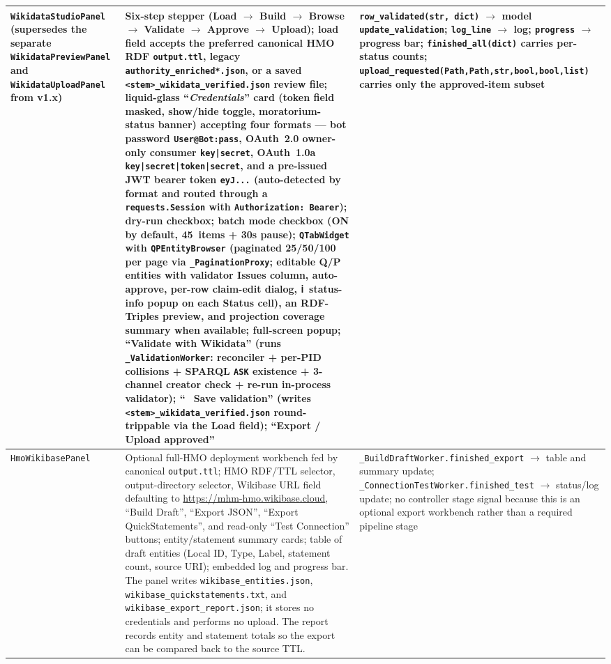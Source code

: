 \documentclass[12pt]{article}
\newcommand{\code}[1]{\texttt{#1}}
\begin{document}
\begin{longtable}{|l|p{4.5cm}|p{4.5cm}|}
\hline
\code{WikidataStudioPanel} (supersedes the separate \code{WikidataPreviewPanel} and \code{WikidataUploadPanel} from v1.x) & Six-step stepper (Load $\to$ Build $\to$ Browse $\to$ Validate $\to$ Approve $\to$ Upload); load field accepts the preferred canonical HMO RDF \code{output.ttl}, legacy \code{authority\_enriched*.json}, or a saved \code{<stem>\_wikidata\_verified.json} review file; liquid-glass ``\emph{Credentials}'' card (token field masked, show/hide toggle, moratorium-status banner) accepting four formats --- bot password \code{User@Bot:pass}, OAuth~2.0 owner-only consumer \code{key|secret}, OAuth~1.0a \code{key|secret|token|secret}, and a pre-issued JWT bearer token \code{eyJ...} (auto-detected by format and routed through a \code{requests.Session} with \code{Authorization: Bearer}); dry-run checkbox; batch mode checkbox (ON by default, 45~items + 30s pause); \code{QTabWidget} with \code{QPEntityBrowser} (paginated 25/50/100 per page via \code{\_PaginationProxy}; editable Q/P entities with validator Issues column, auto-approve, per-row claim-edit dialog, ℹ~status-info popup on each Status cell), an RDF-Triples preview, and projection coverage summary when available; full-screen popup; ``Validate with Wikidata'' (runs \code{\_ValidationWorker}: reconciler + per-PID collisions + SPARQL \code{ASK} existence + 3-channel creator check + re-run in-process validator); ``💾~Save validation'' (writes \code{<stem>\_wikidata\_verified.json} round-trippable via the Load field); ``Export / Upload approved'' & \code{row\_validated(str, dict)} $\to$ model \code{update\_validation}; \code{log\_line} $\to$ log; \code{progress} $\to$ progress bar; \code{finished\_all(dict)} carries per-status counts; \code{upload\_requested(Path,Path,str,bool,bool,list)} carries only the approved-item subset \\
\hline
\code{HmoWikibasePanel} & Optional full-HMO deployment workbench fed by canonical \code{output.ttl}; HMO RDF/TTL selector, output-directory selector, Wikibase URL field defaulting to \url{https://mhm-hmo.wikibase.cloud}, ``Build Draft'', ``Export JSON'', ``Export QuickStatements'', and read-only ``Test Connection'' buttons; entity/statement summary cards; table of draft entities (Local ID, Type, Label, statement count, source URI); embedded log and progress bar. The panel writes \code{wikibase\_entities.json}, \code{wikibase\_quickstatements.txt}, and \code{wikibase\_export\_report.json}; it stores no credentials and performs no upload. The report records entity and statement totals so the export can be compared back to the source TTL. & \code{\_BuildDraftWorker.finished\_export} $\to$ table and summary update; \code{\_ConnectionTestWorker.finished\_test} $\to$ status/log update; no controller stage signal because this is an optional export workbench rather than a required pipeline stage \\
\hline
\end{longtable}
\end{document}
